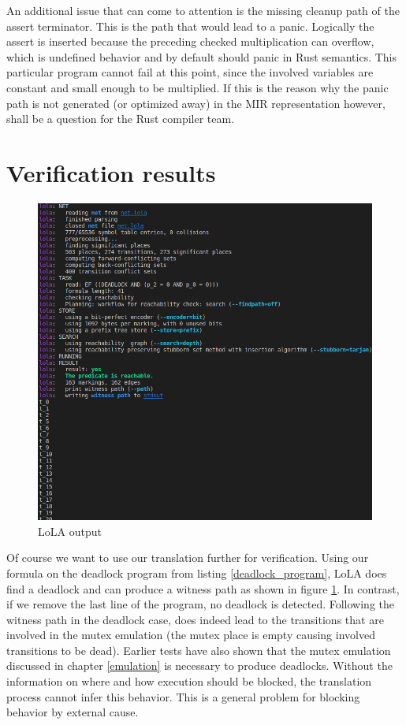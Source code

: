 An additional issue that can come to attention is the missing cleanup path of the assert terminator.
This is the path that would lead to a panic.
Logically the assert is inserted because the preceding checked multiplication can overflow, which is undefined behavior and by default should panic in Rust semantics.
This particular program cannot fail at this point, since the involved variables are constant and small enough to be multiplied.
If this is the reason why the panic path is not generated (or optimized away) in the MIR representation however, shall be a question for the Rust compiler team.

\section{Verification results}
\begin{figure}
  \centering
  \includegraphics[width=1\textwidth]{./pictures/lola_output.png}
  \caption{LoLA output}
  \label{lola_output}
\end{figure}
Of course we want to use our translation further for verification.
Using our formula on the deadlock program from listing \ref{deadlock_program}, LoLA does find a deadlock and can produce a witness path as shown in figure \ref{lola_output}.
In contrast, if we remove the last line of the program, no deadlock is detected.
Following the witness path in the deadlock case, does indeed lead to the transitions that are involved in the mutex emulation (the mutex place is empty causing involved transitions to be dead).
Earlier tests have also shown that the mutex emulation discussed in chapter \ref{emulation} is necessary to produce deadlocks.
Without the information on where and how execution should be blocked, the translation process cannot infer this behavior.
This is a general problem for blocking behavior by external cause.


